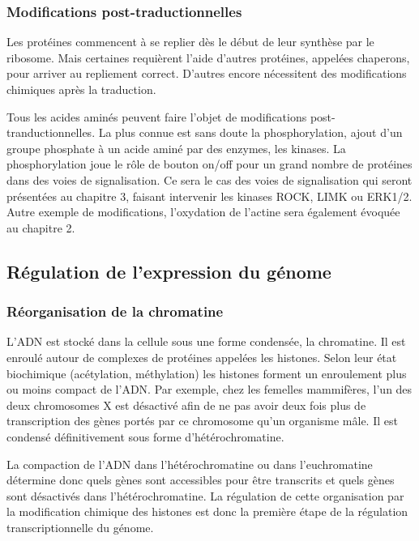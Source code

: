 \subsubsection{Modifications post-traductionnelles}

Les protéines commencent à se replier dès le début de leur synthèse par le ribosome. Mais certaines requièrent l'aide d'autres protéines, appelées chaperons, pour arriver au repliement correct. D'autres encore nécessitent des modifications chimiques après la traduction. 

Tous les acides aminés peuvent faire l'objet de modifications post-tranductionnelles. La plus connue est sans doute la phosphorylation, ajout d'un groupe phosphate à un acide aminé par des enzymes, les kinases. La phosphorylation joue le rôle de bouton on/off pour un grand nombre de protéines dans des voies de signalisation. Ce sera le cas des voies de signalisation qui seront présentées au chapitre 3, faisant intervenir les kinases ROCK, LIMK ou ERK1/2. 
Autre exemple de modifications, l'oxydation de l'actine sera également évoquée au chapitre 2. 


\subsection{Régulation de l'expression du génome}

\subsubsection{Réorganisation de la chromatine}

L'ADN est stocké dans la cellule sous une forme condensée, la chromatine. Il est enroulé autour de complexes de protéines appelées les histones. Selon leur état biochimique (acétylation, méthylation) les histones forment un enroulement plus ou moins compact de l'ADN. Par exemple, chez les femelles mammifères, l'un des deux chromosomes X est désactivé afin de ne pas avoir deux fois plus de transcription des gènes portés par ce chromosome qu'un organisme mâle. Il est condensé définitivement sous forme d'hétérochromatine. 

La compaction de l'ADN dans l'hétérochromatine ou dans l'euchromatine détermine donc quels gènes sont accessibles pour être transcrits et quels gènes sont désactivés dans l'hétérochromatine. 
La régulation de cette organisation par la modification chimique des histones est donc la première étape de la régulation transcriptionnelle du génome. 

